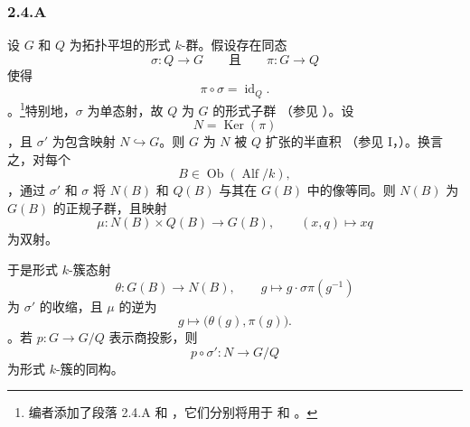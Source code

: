 
\subsubsection*{2.4.A}
\label{sga3:VIIB:2.4.A}

设 \(G\) 和 \(Q\) 为拓扑平坦的形式 \(k\)-群。假设存在同态 \[
  \sigma:Q\longrightarrow G
  \qquad\text{且}\qquad
  \pi:G\longrightarrow Q
\] 使得 \[
  \pi\circ\sigma=\operatorname{id}_Q.
\]。\footnote{\label{sga3:VIIB:nde:92}编者添加了段落 2.4.A 和 ，它们分别将用于  和 。}特别地，\(\sigma\) 为单态射，故 \(Q\) 为 \(G\) 的形式子群 \textup{（参见 ）}。设 \[
  N=\operatorname{Ker}(\pi)
\]，且 \(\sigma'\) 为包含映射 \(N\hookrightarrow G\)。则 \(G\) 为 \(N\) 被 \(Q\) 扩张的半直积 \textup{（参见 I，）}。换言之，对每个 \[
  B\in\operatorname{Ob}(\operatorname{Alf}/k),
\]，通过 \(\sigma'\) 和 \(\sigma\) 将 \(N(B)\) 和 \(Q(B)\) 与其在 \(G(B)\) 中的像等同。则 \(N(B)\) 为 \(G(B)\) 的正规子群，且映射 \begin{equation}
  \mu:N(B)\times Q(B)\longrightarrow G(B),
  \qquad
  (x,q)\longmapsto xq
  \tag{1}
  \label{sga3:VIIB:2.4.A:eq1}
\end{equation} 为双射。

于是形式 \(k\)-簇态射 \begin{equation}
  \theta:G(B)\longrightarrow N(B),
  \qquad
  g\longmapsto g\cdot\sigma\pi(g^{-1})
  \tag{2}
  \label{sga3:VIIB:2.4.A:eq2}
\end{equation} 为 \(\sigma'\) 的收缩，且 \(\mu\) 的逆为 \begin{equation}
  g\longmapsto\bigl(\theta(g),\pi(g)\bigr).
  \tag{3}
  \label{sga3:VIIB:2.4.A:eq3}
\end{equation}。若 \(p:G\to G/Q\) 表示商投影，则 \[
  p\circ\sigma':N\longrightarrow G/Q
\] 为形式 \(k\)-簇的同构。

